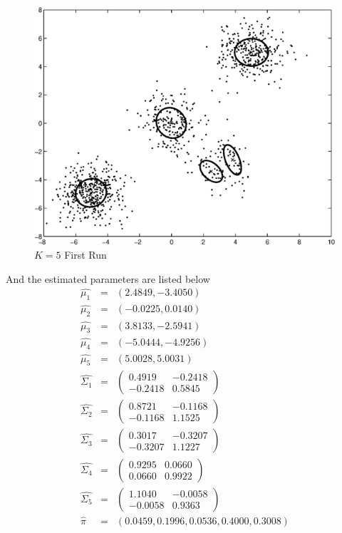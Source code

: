 \documentclass[12pt]{article}
\begin{document}
\begin{figure}[ht!]
  \centering
  \includegraphics[width=0.7 \textwidth]{c2-1}
  \caption{$K = 5$ First Run \label{fig:c2-1}}
\end{figure}

And the estimated parameters are listed below
\begin{eqnarray*}
\hat{\mu_1} &=& (2.4849,   -3.4050) \\
\hat{\mu_2} &=& (-0.0225,    0.0140) \\
\hat{\mu_3} &=& (3.8133,   -2.5941) \\
\hat{\mu_4} &=& (-5.0444,   -4.9256) \\
\hat{\mu_5} &=& (5.0028,    5.0031) \\
\hat{\Sigma_1} &=&
  \begin{pmatrix}
    0.4919  & -0.2418 \\
   -0.2418  &  0.5845
  \end{pmatrix} \\
\hat{\Sigma_2} &=& 
  \begin{pmatrix}
    0.8721  & -0.1168 \\
   -0.1168  &  1.1525
  \end{pmatrix} \\
\hat{\Sigma_3} &=&
  \begin{pmatrix}
    0.3017  & -0.3207 \\
   -0.3207  &  1.1227
  \end{pmatrix} \\
\hat{\Sigma_4} &=& 
  \begin{pmatrix}
    0.9295  &  0.0660 \\
    0.0660  &  0.9922
  \end{pmatrix} \\
\hat{\Sigma_5} &=& 
  \begin{pmatrix}
    1.1040  & -0.0058 \\
   -0.0058  &  0.9363
  \end{pmatrix} \\
\hat{\pi} &=& (0.0459, 0.1996, 0.0536, 0.4000, 0.3008)
\end{eqnarray*}
\end{document}
